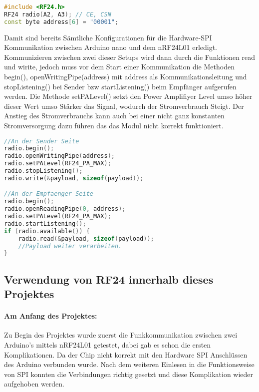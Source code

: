 \documentclass[12pt]{article}
\begin{document}
       \begin{file}[RF24 initialisieren]
        \begin{lstlisting}[language=C++]
#include <RF24.h>
RF24 radio(A2, A3); // CE, CSN
const byte address[6] = "00001";
        \end{lstlisting}
        \end{file}
        
        Damit sind bereits Sämtliche Konfigurationen für die Hardware-SPI Kommunikation zwischen Arduino nano und dem nRF24L01 erledigt.
        Kommunizieren zwischen zwei dieser Setups wird dann durch die Funktionen read und wirite,
        jedoch muss vor dem Start einer Kommunikation die Methoden begin(),
        openWritingPipe(address) mit address als Kommunikationsleitung und stopListening() bei Sender bzw startListening() beim Empfänger aufgerufen werden.
        Die Methode setPALevel() setzt den Power Amplifiyer Level umso höher dieser Wert umso Stärker das Signal,
        wodurch der Stromverbrauch Steigt.
        Der Anstieg des Stromverbrauchs kann auch bei einer nicht ganz konstanten Stromversorgung dazu führen das das Modul nicht korrekt funktioniert.
       \begin{file}[RF24 initialisieren]
        \begin{lstlisting}[language=C++]
//An der Sender Seite
radio.begin();
radio.openWritingPipe(address);
radio.setPALevel(RF24_PA_MAX);
radio.stopListening();
radio.write(&payload, sizeof(payload));

//An der Empfaenger Seite
radio.begin();
radio.openReadingPipe(0, address);
radio.setPALevel(RF24_PA_MAX); 
radio.startListening();
if (radio.available()) {
	radio.read(&payload, sizeof(payload));
	//Payload weiter verarbeiten.
}
        \end{lstlisting}
        \end{file} 
	\subsection{Verwendung von RF24 innerhalb dieses Projektes}
	\paragraph{Am Anfang des Projektes: }
	Zu Begin des Projektes wurde zuerst die Funkkommunikation zwischen zwei Arduino's mittels nRF24L01 getestet, dabei gab es schon die ersten Komplikationen. Da der Chip nicht korrekt mit den Hardware SPI Anschlüssen des Arduino verbunden wurde. Nach dem weiteren Einlesen in die Funktionsweise von SPI konnten die Verbindungen richtig gesetzt und diese Komplikation wieder aufgehoben werden.
\end{document}
